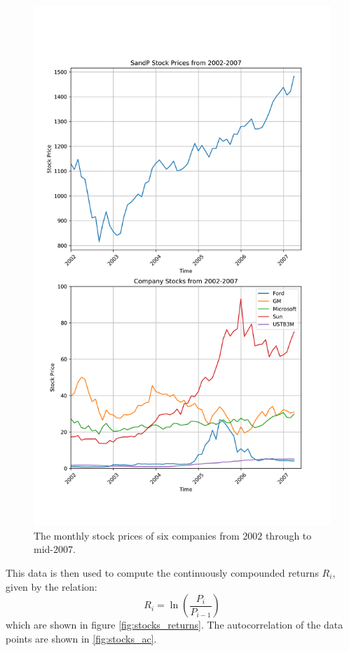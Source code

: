 \documentclass[11pt, letterpage]{article}
\begin{document}
\begin{figure}
  \includegraphics[width=\linewidth]{stocks_time.png}
  \caption{
    The monthly stock prices of six companies from $2002$ through to mid-$2007$.
  }
  \label{fig:stocks_time}
\end{figure}

This data is then used to compute the continuously compounded returns $R_i$,
given by the relation:
\begin{equation}
  R_i = \ln\left( \frac{P_i}{P_{i-1}} \right)
  \label{ccr}
\end{equation}
which are shown in figure \ref{fig:stocks_returns}. The autocorrelation of the
data points are shown in \ref{fig:stocks_ac}.
\end{document}
